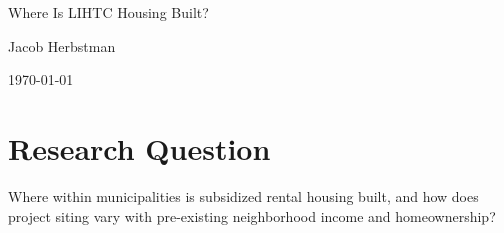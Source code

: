 \documentclass[12pt]{article}
\begin{document}
\begin{center}
{\Large Where Is LIHTC Housing Built?}

\vspace{1em}
Jacob Herbstman

\vspace{0.5em}
\today
\end{center}

\begin{abstract}
This project studies the locations of Low-Income Housing Tax Credit
developments. It asks whether projects disproportionately favor poorer
neighborhoods with fewer homeowners inside the same municipality. The
empirical design and analysis have not yet been fixed.
\end{abstract}

\section{Research Question}

Where within municipalities is subsidized rental housing built, and how does
project siting vary with pre-existing neighborhood income and homeownership?
\end{document}

